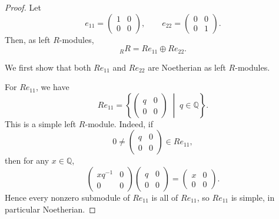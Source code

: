 \begin{proof}
    Let
    \[
        e_{11}=
        \begin{pmatrix}
            1 & 0 \\
            0 & 0
        \end{pmatrix},
        \qquad
        e_{22}=
        \begin{pmatrix}
            0 & 0 \\
            0 & 1
        \end{pmatrix}.
    \]
    Then, as left $R$-modules,
    \[
        {}_R R = Re_{11}\oplus Re_{22}.
    \]

    We first show that both $Re_{11}$ and $Re_{22}$ are Noetherian as left
    $R$-modules.

    For $Re_{11}$, we have
    \[
        Re_{11}
        =
        \left\{
        \begin{pmatrix}
            q & 0 \\
            0 & 0
        \end{pmatrix}
        \;\middle|\;
        q\in\mathbb{Q}
        \right\}.
    \]
    This is a simple left $R$-module. Indeed, if
    \[
        0\neq
        \begin{pmatrix}
            q & 0 \\
            0 & 0
        \end{pmatrix}
        \in Re_{11},
    \]
    then for any $x\in \mathbb{Q}$,
    \[
        \begin{pmatrix}
            xq^{-1} & 0 \\
            0       & 0
        \end{pmatrix}
        \begin{pmatrix}
            q & 0 \\
            0 & 0
        \end{pmatrix}
        =
        \begin{pmatrix}
            x & 0 \\
            0 & 0
        \end{pmatrix}.
    \]
    Hence every nonzero submodule of $Re_{11}$ is all of $Re_{11}$, so
    $Re_{11}$ is simple, in particular Noetherian.


\end{proof}
